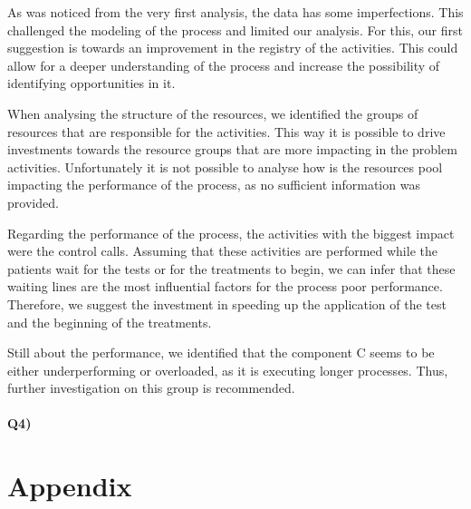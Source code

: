 \documentclass[12pt]{report}
\begin{document}
As was noticed from the very first analysis, the data has some imperfections. This challenged the modeling of the process and limited our analysis. For this, our first suggestion is towards an improvement in the registry of the activities. This could allow for a deeper understanding of the process and increase the possibility of identifying opportunities in it.

When analysing the structure of the resources, we identified the groups of resources that are responsible for the activities. This way it is possible to drive investments towards the resource groups that are more impacting in the problem activities. Unfortunately it is not possible to analyse how is the resources pool impacting the performance of the process, as no sufficient information was provided.

Regarding the performance of the process, the activities with the biggest impact were the control calls. Assuming that these activities are performed while the patients wait for the tests or for the treatments to begin, we can infer that these waiting lines are the most influential factors for the process poor performance. Therefore, we suggest the investment in speeding up the application of the test and the beginning of the treatments.

Still about the performance, we identified that the component C seems to be either underperforming or overloaded, as it is executing longer processes. Thus, further investigation on this group is recommended.

\paragraph{Q4)} 

\newpage
\section{Appendix}
\end{document}
